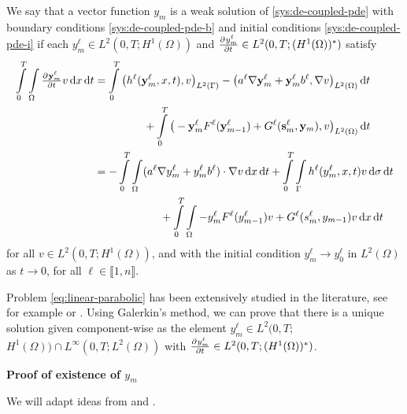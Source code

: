 \documentclass[11pt]{article}
\newcommand{\llb}{\llbracket}
\newcommand{\rrb}{\rrbracket}
\newcommand{\by}{\mathbf{y}}
\begin{document}
We say that a vector function \(y_m\) is a weak solution of \eqref{sys:de-coupled-pde} with boundary conditions \eqref{sys:de-coupled-pde-b} and initial conditions \eqref{sys:de-coupled-pde-i} if each \(y^\ell_m \in L^2(0,T;H^1(\Omega)) \) and \( \pd{y_m^\ell}{t} \in L^2(0,T;(H^1(\Omega))^*) \)  satisfy
	\begin{align}
		\int\limits_0^T \int\limits_\Omega \pd{\by_m^\ell}{t} v  \dif x \dif t
		&=
		\int\limits_0^T 
		\big( h^\ell (\by_m^\ell,x,t), v\big)_{L^2 (\Gamma)} -  \big( a^\ell \nabla \by_m^\ell + \by_m^\ell b^\ell , \nabla v\big)_{L^2(\Omega)}  \dif t
		\notag
		\\
		&\qquad\qquad\,\,\,
		+
		\int\limits_0^T \big(-\by_m^\ell F^\ell(\by_{m-1}^\ell) + G^\ell(\mathbf{s}_m^\ell,\mathbf{y}_{m}), v \big)_{L^2(\Omega)} \dif t
		\notag
		\\
		\label{eq:linear-parabolic}
		&=
		-
		\int\limits_0^T 
		\int\limits_\Omega (a^\ell \nabla y_m^\ell + y_m^\ell b^\ell ) \cdot \nabla v \dif x \dif t
		+
		\int\limits_0^T 
		\int\limits_\Gamma h^\ell (y_{m}^\ell,x,t) v \dif \sigma\dif t 
		\\ &\qquad\qquad\qquad	\notag
		+
		\int\limits_0^T \int\limits_\Omega 
		-y_m^\ell F^\ell(y^\ell_{m-1}) v + G^\ell(s_m^\ell, y_{m-1}) v \dif x \dif t
	\end{align}
	for all \( v \in L^2 (0,T;H^1(\Omega) ) \), and with the initial condition \( y_m^\ell \to y_0^\ell \) in \(L^2(\Omega)\) as \( t\to 0\), for all \(\ell \in \llb 1,n\rrb\). 
	
Problem \eqref{eq:linear-parabolic} has been extensively studied in the literature, see for example \cite{Ladyzenskaja-1968} or \cite{Pao-1993}. Using Galerkin's method, we can prove that there is a unique solution given component-wise as the element \(y_m^\ell \in L^2(0,T;\)  \( H^1(\Omega)) \cap L^\infty(0,T; L^2(\Omega))\) with \( \pd{y_m^\ell}{t} \in L^2(0,T; (H^1(\Omega))^*) \).



\vspace{1\baselineskip}
\noindent\textbf{Proof of existence of \(y_m\)}
\vspace{0.5\baselineskip}
	
	We will adapt ideas from \cite{Ladyzenskaja-1968,Troltzsch-2010} and \cite{Evans-2010}.
	
\end{document}

